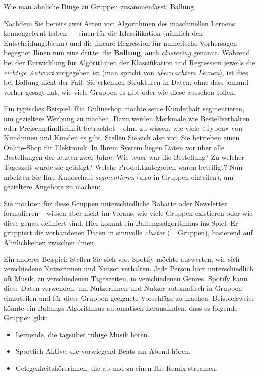\begin{lpu}{Wie man ähnliche Dinge zu Gruppen zusammenfasst: Ballung}

Nachdem Sie bereits zwei Arten von Algorithmen des maschinellen Lernens kennengelernt haben — einen für die Klassifikation (nämlich den Entscheidungsbaum) und die lineare Regression für numerische Vorhersagen — begegnet Ihnen nun eine dritte: die \textbf{Ballung}, auch \emph{clustering} genannt. Während bei der Entwicklung für Algorithmen der Klassifikation und Regression jeweils die \emph{richtige Antwort} vorgegeben ist (man spricht von \emph{überwachtem Lernen}), ist dies bei Ballung nicht der Fall: Sie erkennen Strukturen in Daten, ohne dass jemand vorher gesagt hat, wie viele Gruppen es gibt oder wie diese aussehen sollen.

Ein typisches Beispiel: Ein Onlineshop möchte seine Kundschaft segmentieren, um gezieltere Werbung zu machen. Dazu werden Merkmale wie Bestellverhalten oder Preisempfindlichkeit betrachtet – ohne zu wissen, wie viele «Typen» von Kundinnen und Kunden es gibt. Stellen Sie sich also vor, Sie betrieben einen Online-Shop für Elektronik. In Ihrem System liegen Daten vor über alle Bestellungen der letzten zwei Jahre: Wie teuer war die Bestellung? Zu welcher Tageszeit wurde sie getätigt? Welche Produktkategorien waren beteiligt? Nun möchten Sie Ihre Kundschaft \textit{segmentieren} (also in Gruppen einteilen), um gezieltere Angebote zu machen:

Sie möchten für diese Gruppen unterschiedliche Rabatte oder Newsletter formulieren – wissen aber nicht im Voraus, wie viele Gruppen existieren oder wie diese genau definiert sind. Hier kommt ein Ballungsalgorithmus ins Spiel: Er gruppiert die vorhandenen Daten in sinnvolle \textit{cluster} (= Gruppen), basierend auf Ähnlichkeiten zwischen ihnen.

Ein anderes Beispiel: Stellen Sie sich vor, Spotify möchte auswerten, wie sich verschiedene Nutzerinnen und Nutzer verhalten. Jede Person hört unterschiedlich oft Musik, zu verschiedenen Tageszeiten, in verschiedenen Genres. Spotify kann diese Daten verwenden, um Nutzerinnen und Nutzer automatisch in Gruppen einzuteilen und für diese Gruppen geeignete Vorschläge zu machen. Beispielsweise könnte ein Ballungs-Algorithmus automatisch herausfinden, dass es folgende Gruppen gibt:

\begin{itemize}
  \item Lernende, die tagsüber ruhige Musik hören.
  \item Sportlich Aktive, die vorwiegend Beats am Abend hören.
  \item Gelegenheitshörerinnen, die ab und zu einen Hit-Remix streamen.
\end{itemize}


\end{lpu}
